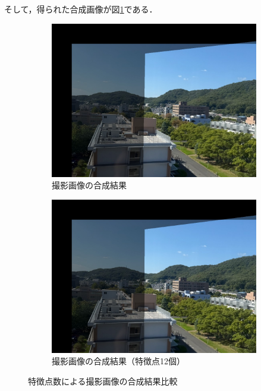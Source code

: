\documentclass[autodetect-engine,dvi=dvipdfmx,ja=standard,
               a4j,11pt]{bxjsarticle}
\begin{document}
そして，得られた合成画像が図\ref{fig:3.2-mypicture.jpg}である．
\begin{figure}[h]
 \centering
 \begin{subfigure}[b]{0.45\textwidth}
   \centering
   \includegraphics[scale=0.2]{3.2-mypicture.jpg}
   \caption{撮影画像の合成結果}
   \label{fig:3.2-mypicture.jpg}
 \end{subfigure}
 \hspace{5mm}
 \begin{subfigure}[b]{0.45\textwidth}
   \centering
   \includegraphics[scale=0.2]{3.2-mypicture_w-12.jpg}
   \caption{撮影画像の合成結果（特徴点12個）}
   \label{fig:3.2-mypicture_w-12.jpg}
 \end{subfigure}
 \caption{特徴点数による撮影画像の合成結果比較}
 \label{fig:comparison_mypicture}
\end{figure}
\end{document}
